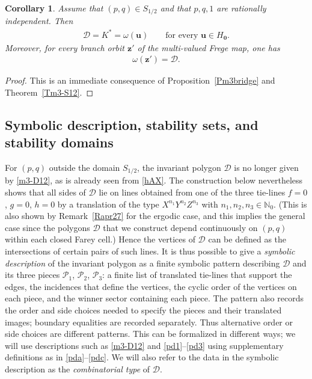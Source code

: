 \documentclass[11pt,reqno,tbtags,a4paper]{amsart}
\numberwithin{equation}{section}
\theoremstyle{plain}%
\newtheorem{corollary}[theorem]{Corollary}
\theoremstyle{definition}
\theoremstyle{remark}
\newcommand{\refT}[1]{Theorem~\ref{#1}}
\newcommand{\refR}[1]{Remark~\ref{#1}}
\newcommand\bbN{\mathbb N}
\newcommand\cD{\mathcal D}
\newcommand\cL{{\omega}}
\newcommand\cP{\mathcal P}
\newcommand\Ho{H_{\0}}
\newcommand\vu{\mathbf{u}}
\newcommand\vz{\mathbf{z}}
\newcommand\bbNo{\bbN_0}
\newcommand\Kx{K^*}
\newcommand\0{{\boldsymbol 0}}
\newcommand\1{{\boldsymbol 1}}
\begin{document}
\begin{corollary}\label{Cm3-S12-ergodic}
Assume that $(p,q)\in S_{1/2}$ and that $p,q,1$ are rationally independent.
Then
\begin{align}
\cD=\Kx=\cL(\vu)\qquad\text{for every }\vu\in\Ho.
\end{align}
Moreover, for every branch orbit $\vz'$ of the multi-valued Frege map, one has
\begin{align}
\omega(\vz')=\cD.
\end{align}
\end{corollary}

\begin{proof}
This is an immediate consequence of Proposition~\ref{Pm3bridge} and 
\refT{Tm3-S12}.
\end{proof}

\subsection{Symbolic description, stability sets, and stability domains}
\label{SSsymbolic}

For $(p,q)$ outside the domain $S_{1/2}$, the invariant polygon $\cD$ is no
longer given by \eqref{m3-D12}, as is already seen from \eqref{hAX}.
The construction below nevertheless shows that 
all sides of $\cD$ lie on lines obtained from one of
the three tie-lines
$f=0$, $g=0$, $h=0$
by a translation of the type $X^{n_1}Y^{n_2}Z^{n_3}$ with $n_1,n_2,n_3\in\bbNo$.
(This is also shown by \refR{Rapr27} for the ergodic case, and this implies
the general case since the polygons $\cD$ that we construct depend continuously on $(p,q)$ within each closed Farey cell.)
Hence the vertices of $\cD$ can be defined as the intersections of certain
pairs of such lines.
%
It is thus possible to give a \emph{symbolic description} of the invariant
polygon as
a finite symbolic pattern  describing $\cD$ and its three pieces
$\cP_1$, $\cP_2$, $\cP_3$: a finite list of translated tie-lines that
support the
edges, the incidences that define the vertices, the cyclic order of the
vertices on each piece, and the winner sector containing each piece.
The pattern also records the order and side choices needed to specify
the pieces and their translated images; boundary equalities are recorded
separately. Thus alternative order or side choices are different patterns.
This can be formalized in different ways; we will %
use descriptions such as \eqref{m3-D12} and \eqref{pd1}--\eqref{pd3}
using supplementary definitions as in \eqref{pda}--\eqref{pdc}.
We will also refer to the data in the symbolic description as the
\emph{combinatorial type} of $\cD$.
\end{document}
